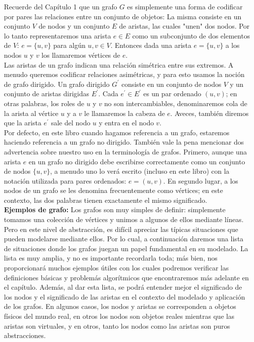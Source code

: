 \documentclass[a4paper]{article}
\begin{document}
Recuerde del Capítulo 1 que un grafo $G$ es simplemente una forma de codificar por pares las
relaciones entre un conjunto de objetos: La misma consiste en un conjunto $V$ de nodos
y un conjunto $E$ de aristas, las cuales "unen" dos nodos. Por lo tanto
representaremos una arista $e \in E$ como un subconjunto de dos elementos de $V$: $e = \{u, v\}$ para algún $u, v \in V$.  Entonces dada una arista  $e = \{u, v\}$ a los nodos $u$ y $v$ los llamaremos vértices de $e$.\\

Las aristas de un grafo indican una relación simétrica entre sus extremos.
A menudo queremos codificar relaciones asimétricas, y para esto usamos la
noción de grafo dirigido. Un grafo dirigido $G^{'}$ consiste en un conjunto
de nodos $V$ y un conjunto de aristas dirigidas $E^{'}$.  Cada $e^{'} \in E^{'}$ es un par ordenado $(u, v)$; en otras palabras, los roles de $u$ y $v$ no son intercambiables,   denominaremos cola de la arista al vértice $u$ y a $v$ le llamaremos la cabeza de $e$. Aveces, también diremos que la arista $e^{'}$ sale del nodo $u$ y entra en el nodo $v$. \\

Por defecto, en este libro cuando hagamos referencia a un grafo, estaremos haciendo referencia a un grafo no dirigido. También vale la pena mencionar dos advertencia sobre nuestro uso en la terminología de grafos. Primero, aunque una arista $e$ en un grafo no dirigido debe escribirse correctamente como un conjunto de nodos $\{u, v\}$,  a menudo uno lo verá escrito (incluso en este libro) con la notación utilizada para pares ordenados: $e = (u,v)$. En segundo lugar, a los nodos de un grafo se les denomina frecuentemente como vértices; en este contexto, las dos palabras tienen exactamente el mismo significado.  \\

\textbf{Ejemplos de grafo:} Los grafos son muy simples de definir: simplemente tomamos una colección
de vértices y unimos a algunos de ellos mediante líneas. Pero en este nivel de abstracción,
es difícil apreciar las típicas situaciones que pueden modelarse mediante ellos. Por lo cual, a continuación daremos una lista de situaciones donde los grafos juegan un papel fundamental en su modelado. La lista es muy amplia, y no es importante recordarla toda; más bien, nos proporcionará muchos ejemplos útiles con los cuales podremos verificar las definiciones básicas y problemás algorítmicos que encontraremos más adelante en el capítulo. Además, al dar esta lista, se podrá entender mejor el significado de los nodos y el significado de las aristas en
el contexto del modelado y aplicación de los grafos. En algunos casos, los nodos y aristas se corresponden a objetos físicos del mundo real, en otros los nodos son objetos reales
mientras que las aristas son virtuales, y en otros, tanto los nodos como las aristas son puros
abstracciones. \\
\end{document}
